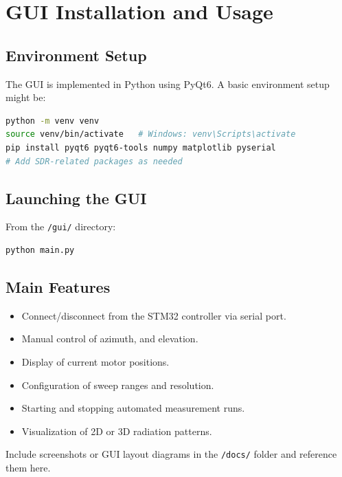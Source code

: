 \chapter{GUI Installation and Usage}

\section{Environment Setup}

The GUI is implemented in Python using PyQt6. A basic environment setup might be:

\begin{lstlisting}[language=bash]
python -m venv venv
source venv/bin/activate   # Windows: venv\Scripts\activate
pip install pyqt6 pyqt6-tools numpy matplotlib pyserial
# Add SDR-related packages as needed
\end{lstlisting}

\section{Launching the GUI}

From the \texttt{/gui/} directory:

\begin{lstlisting}[language=bash]
python main.py
\end{lstlisting}

\section{Main Features}

\begin{itemize}
  \item Connect/disconnect from the STM32 controller via serial port.
  \item Manual control of azimuth, and elevation.
  \item Display of current motor positions.
  \item Configuration of sweep ranges and resolution.
  \item Starting and stopping automated measurement runs.
  \item Visualization of 2D or 3D radiation patterns.
\end{itemize}

Include screenshots or GUI layout diagrams in the \texttt{/docs/} folder and reference them here.
